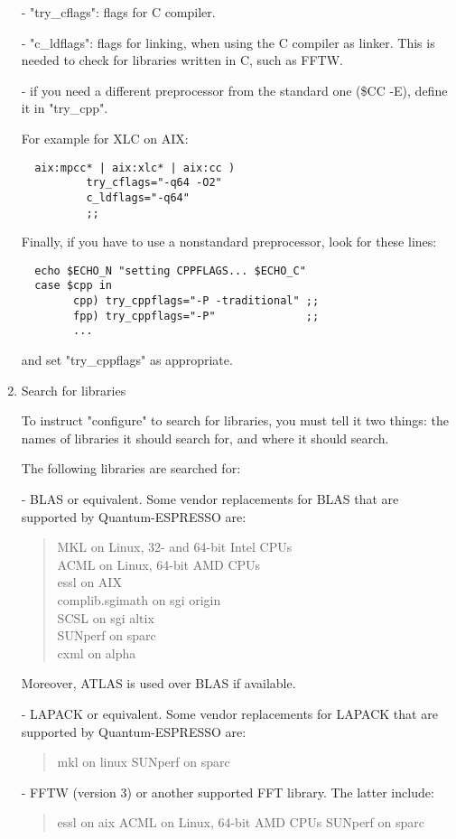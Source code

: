 \documentclass[12pt,a4paper]{article}
\begin{document}
\begin{enumerate}
- "try\_cflags": flags for C compiler.

- "c\_ldflags": flags for linking, when using the C compiler as linker.
This is needed to check for libraries written in C, such as FFTW.

- if you need a different preprocessor from the standard one (\$CC -E),
define it in "try\_cpp".

For example for XLC on AIX:
\begin{verbatim}
  aix:mpcc* | aix:xlc* | aix:cc )
          try_cflags="-q64 -O2"
          c_ldflags="-q64"
          ;;
\end{verbatim}
Finally, if you have to use a nonstandard preprocessor, look for these
lines:
\begin{verbatim}
  echo $ECHO_N "setting CPPFLAGS... $ECHO_C"
  case $cpp in
        cpp) try_cppflags="-P -traditional" ;;
        fpp) try_cppflags="-P"              ;;
        ...
\end{verbatim}
and set "try\_cppflags" as appropriate.

\item Search for libraries

To instruct "configure" to search for libraries, you must tell it two
things: the names of libraries it should search for, and where it
should search.

The following libraries are searched for:

- BLAS or equivalent. 
Some vendor replacements for BLAS that are supported by Quantum-ESPRESSO are:
\begin{quote}
    MKL on Linux, 32- and 64-bit Intel CPUs\\
    ACML on Linux, 64-bit AMD CPUs\\
    essl on AIX\\
    complib.sgimath on sgi origin\\
    SCSL on sgi altix\\
    SUNperf on sparc\\
    cxml on alpha
\end{quote}
Moreover, ATLAS is used over BLAS if available.

- LAPACK or equivalent. Some vendor replacements for LAPACK that are supported by Quantum-ESPRESSO are:
\begin{quote}
    mkl on linux
    SUNperf on sparc
\end{quote}

- FFTW (version 3) or another supported FFT library. The latter include:
\begin{quote}
    essl on aix
    ACML on Linux, 64-bit AMD CPUs
    SUNperf on sparc
\end{quote}


\end{enumerate}
\end{document}
